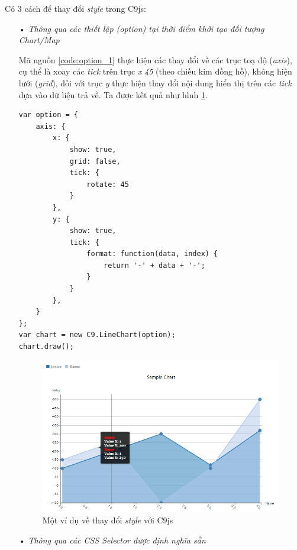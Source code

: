 \documentclass[12pt,a4paper,twoside]{article}
\begin{document}
Có 3 cách để thay đổi \textit{style} trong C9js:
\begin{itemize}
\item[•] \emph{Thông qua các thiết lập (option) tại thời điểm khởi tạo đối tượng Chart/Map}

Mã nguồn \ref{code:option_1} thực hiện các thay đổi về các trục toạ độ (\textit{axis}), cụ thể là xoay các \textit{tick} trên trục \textit{x} \textit{45\degree}  (theo chiều kim đồng hồ), không hiện lưới (\textit{grid}), đối với trục \textit{y} thực hiện thay đổi nội dung hiển thị trên các \textit{tick} dựa vào dữ liệu trả về. Ta được kết quả như hình \ref{fig:option_2}.
 
\begin{lstlisting}[caption=Thay đổi \textit{style} tại thời điểm khởi tạo Chart, label={code:option_1}]
var option = {
    axis: {
        x: {
            show: true,
            grid: false,
            tick: {
                rotate: 45
            }
        },
        y: {
            show: true,
            tick: {
                format: function(data, index) {
                    return '-' + data + '-';
                }
            }
        },
    }
};
var chart = new C9.LineChart(option);
chart.draw();
\end{lstlisting}

\begin{figure}[!h]
	\begin{center}
    \includegraphics[scale=.8]{image/option_2}
    \caption{Một ví dụ về thay đổi \textit{style} với C9js}
    \label{fig:option_2}
	\end{center}
\end{figure}

\item[•] \emph{Thông qua các CSS Selector được định nghĩa sẵn}


\end{itemize}
\end{document}
